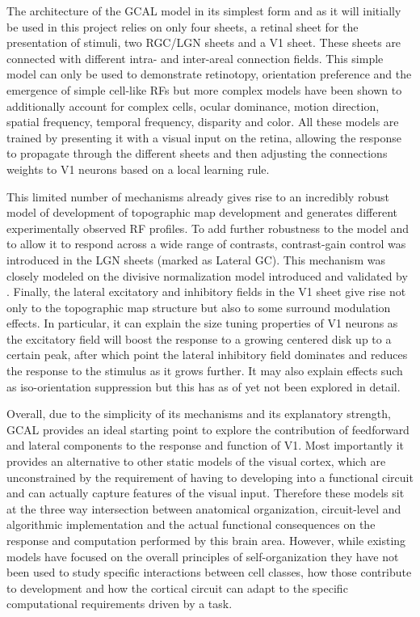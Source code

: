 The architecture of the GCAL model in its simplest form and as it will
initially be used in this project relies on only four sheets, a
retinal sheet for the presentation of stimuli, two RGC/LGN sheets and
a V1 sheet. These sheets are connected with different intra- and
inter-areal connection fields. This simple model can only be used to
demonstrate retinotopy, orientation preference and the emergence of
simple cell-like RFs but more complex models have been shown to
additionally account for complex cells, ocular dominance, motion
direction, spatial frequency, temporal frequency, disparity and
color. All these models are trained by presenting it with a visual
input on the retina, allowing the response to propagate through the
different sheets and then adjusting the connections weights to V1
neurons based on a local learning rule.

This limited number of mechanisms already gives rise to an incredibly
robust model of development of topographic map development and
generates different experimentally observed RF profiles. To add
further robustness to the model and to allow it to respond across a
wide range of contrasts, contrast-gain control was introduced in the
LGN sheets (marked as Lateral GC). This mechanism was closely modeled
on the divisive normalization model introduced and validated by
\cite{Bonin2005}. Finally, the lateral excitatory and inhibitory
fields in the V1 sheet give rise not only to the topographic map
structure but also to some surround modulation effects. In particular,
it can explain the size tuning properties of V1 neurons as the
excitatory field will boost the response to a growing centered disk up
to a certain peak, after which point the lateral inhibitory field
dominates and reduces the response to the stimulus as it grows
further. It may also explain effects such as iso-orientation
suppression but this has as of yet not been explored in detail.

Overall, due to the simplicity of its mechanisms and its explanatory
strength, GCAL provides an ideal starting point to explore the
contribution of feedforward and lateral components to the response and
function of V1. Most importantly it provides an alternative to other
static models of the visual cortex, which are unconstrained by the
requirement of having to developing into a functional circuit and can
actually capture features of the visual input. Therefore these models
sit at the three way intersection between anatomical organization,
circuit-level and algorithmic implementation and the actual functional
consequences on the response and computation performed by this brain
area. However, while existing models have focused on the overall
principles of self-organization they have not been used to study
specific interactions between cell classes, how those contribute to
development and how the cortical circuit can adapt to the specific
computational requirements driven by a task.
